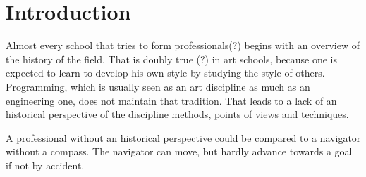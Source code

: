 \section{Introduction}

Almost every school that tries to form professionals(?) begins with an
overview of the history of the field. That is doubly true (?) in art
schools, because one is expected to learn to develop his own style by
studying the style of others. Programming, which is usually seen as an
art discipline as much as an engineering one, does not maintain that
tradition. That leads to a lack of an historical perspective of the
discipline methods, points of views and techniques.

A professional without an historical perspective could be compared to
a navigator without a compass. The navigator can move, but hardly
advance towards a goal if not by accident. 


